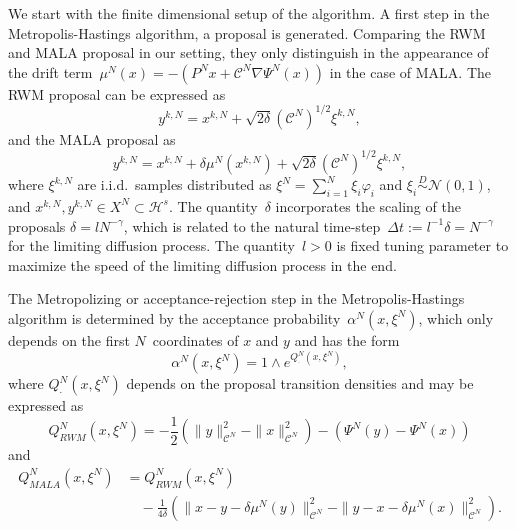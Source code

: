 We start with the finite dimensional setup of the algorithm. A first step in the Metropolis-Hastings algorithm, a proposal is generated. Comparing the RWM and MALA proposal in our setting, they only distinguish in the appearance of the drift term~$\mu^{N}(x) = - (P^{N}x + \mathcal{C}^{N} \nabla \Psi^{N}(x))$ in the case of MALA. The RWM proposal can be expressed as
\begin{equation}
\label{DLR-RWM-proposal short}
 y^{k,N} = x^{k,N} + \sqrt{2 \delta} (\mathcal{C}^{N})^{1/2} \xi^{k,N},
\end{equation}
and the MALA proposal as
\begin{equation}
\label{DLR- MALA-proposal short}
 y^{k,N} = x^{k,N} + \delta \mu^{N}(x^{k,N}) + \sqrt{2 \delta} (\mathcal{C}^{N})^{1/2} \xi^{k,N},
\end{equation}
where $\xi^{k,N}$ are i.i.d.\, samples distributed as $\xi^{N} = \sum_{i=1}^{N} \xi_i \varphi_i$ and $\xi_i \stackrel{D}{\sim} \mathcal{N}(0,1)$, and $x^{k,N}, y^{k,N} \in X^{N} \subset \mathcal{H}^s$. The quantity~$\delta$  incorporates the scaling of the proposals $ \delta = l N^{-\gamma} $, which is related to the natural time-step~$\Delta t := l^{-1} \delta = N^{ - \gamma}$ for the limiting diffusion process. The quantity~$l > 0$ is fixed tuning parameter to maximize the speed of the limiting diffusion process in the end.

The Metropolizing or acceptance-rejection step in the Metropolis-Hastings algorithm is determined by the acceptance probability~$\alpha^{N}(x, \xi^{N})$, which only depends on the first $N$~coordinates of $x$ and $y$ and has the form
\begin{equation}
 \label{DLR-acceptance probability short}
 \alpha^{N} (x, \xi^{N}) = 1 \wedge e^{Q^{N}_{\cdot}(x, \xi^{N})},
\end{equation}
where $Q^{N}_{\cdot}(x, \xi^{N})$ depends on the proposal transition densities and may be expressed as
\begin{equation}
 \label{DLR-Q RWM short}
 Q_{RWM}^{N}(x, \xi^{N}) = - \frac{1}{2} \left(\| y \|_{\mathcal{C}^N}^2 - \| x \|_{\mathcal{C}^N}^2\right) - \left( \Psi^N(y) - \Psi^N(x) \right)
\end{equation}
and 
\begin{equation}
 \label{DLR-Q MALA short}
 \begin{split}
  Q_{MALA}^{N}(x, \xi^{N}) & = Q_{RWM}^{N}(x, \xi^{N}) \\
  & \quad - \frac{1}{4 \delta} \left( \| x - y - \delta \mu^N(y) \|_{\mathcal{C}^N}^2 -  \| y - x - \delta \mu^N(x) \|_{\mathcal{C}^N}^2 \right).
 \end{split}
\end{equation}

